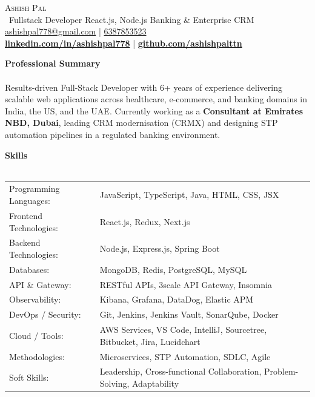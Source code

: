 \documentclass[a4paper]{article}
\newcommand{\lineunder} {
    \vspace*{-8pt} \\
    \hspace*{-18pt} \hrulefill \\
}
\newcommand{\header} [1] {
    {\hspace*{-18pt}\vspace*{6pt} \textbf{#1}}
    \vspace*{-6pt} \lineunder
}
\begin{document}
    \vspace*{-40pt}

%
%
  \vspace*{-2pt}
  \begin{center}
    {\Huge \scshape {Ashish Pal}}\\
    \vspace*{2pt}
    \ {Fullstack Developer \textbar{}  React.js, Node.js \textbar{} Banking \& Enterprise CRM}\\
    \vspace*{2pt}
    \href{mailto:ashishpal778@gmail.com}{ashishpal778@gmail.com} | \href{tel:6387853523}{6387853523}\\
    \vspace*{2pt}
    \textbf{\href{https://www.linkedin.com/in/ashishpal778}{linkedin.com/in/ashishpal778}} | \textbf{\href{https://www.github.com/ashishpalttn}{github.com/ashishpalttn}}\\
  \end{center}

%
%
      \header{Professional Summary}
      \vspace{2mm}
    Results-driven Full-Stack Developer with 6+ years of experience delivering scalable web applications across healthcare, e-commerce, and banking domains in India, the US, and the UAE. Currently working as a \textbf{Consultant at Emirates NBD, Dubai}, leading CRM modernisation (CRMX) and designing STP automation pipelines in a regulated banking environment.\\
\vspace{4mm}

%
%
  \header{Skills}
  \vspace{2mm}
  \begin{longtable}{p{4cm}p{12cm}}
  Programming Languages: & JavaScript, TypeScript, Java, HTML, CSS, JSX\\
  Frontend Technologies: & React.js, Redux, Next.js\\
  Backend Technologies: & Node.js, Express.js, Spring Boot\\
  Databases: & MongoDB, Redis, PostgreSQL, MySQL\\
  API \& Gateway: & RESTful APIs, 3scale API Gateway, Insomnia\\
  Observability: & Kibana, Grafana, DataDog, Elastic APM\\
  DevOps / Security: & Git, Jenkins, Jenkins Vault, SonarQube, Docker\\
  Cloud / Tools: & AWS Services, VS Code, IntelliJ, Sourcetree, Bitbucket, Jira, Lucidchart\\
  Methodologies: & Microservices, STP Automation, SDLC, Agile\\
  Soft Skills: & Leadership, Cross-functional Collaboration, Problem-Solving, Adaptability\\
  \end{longtable}
  \vspace{1mm}
\end{document}
